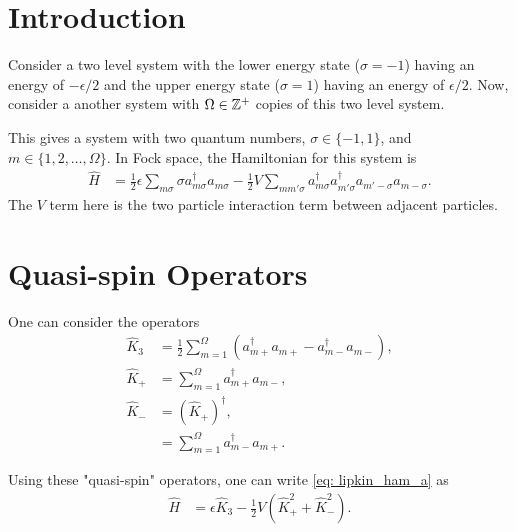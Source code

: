 \documentclass[
a4paper,
10pt,
twoside,
]{article}
\begin{document}
{}
\maketitle
\startmcols

\section{Introduction}\label{sec: I}

Consider a two level system with the lower energy state ($\sigma = -1$) having an energy of $-\epsilon/2$ and the upper energy state ($\sigma=1$) having an energy of $\epsilon/2$.
Now, consider a another system with $\Omega \in \mathbb{Z}^+$ copies of this two level system.

This gives a system with two quantum numbers, $\sigma \in \{-1,1\}$, and $m \in \{1,2,\dots,\Omega\}$.
In Fock space, the Hamiltonian for this system is
\begin{align}
	\hat{H} &= \frac{1}{2} \epsilon \sum_{m\sigma}\sigma a_{m\sigma}^\dagger a_{m\sigma}- \frac{1}{2}V\sum_{mm'\sigma}a_{m\sigma}^\dagger a_{m'\sigma}^\dagger a_{m'-\sigma}a_{m-\sigma}.
	\label{eq: lipkin_ham_a}
\end{align}
The $V$ term here is the two particle interaction term between adjacent particles.

\section{Quasi-spin Operators} \label{sec: II}

One can consider the operators
\begin{align}
	\hat{K}_3 &= \frac{1}{2} \sum_{m=1}^\Omega (a_{m+}^\dagger a_{m+}-a_{m-}^\dagger a_{m-}),\\
	\hat{K}_+ &= \sum_{m=1}^\Omega a_{m+}^\dagger a_{m-},\\
	\hat{K}_- &= (\hat{K}_+)^\dagger,\\
		&= \sum_{m=1}^\Omega a_{m-}^\dagger a_{m+}.
\end{align}

Using these "quasi-spin" operators, one can write \ref{eq: lipkin_ham_a} as
\begin{align}
	\hat{H} &= \epsilon \hat{K}_3 - \frac{1}{2}V (\hat{K}_+^2+\hat{K}_-^2).
	\label{eq: lipkin_ham_k}
\end{align}
\end{document}

